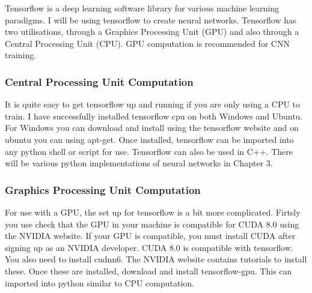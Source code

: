 Tensorflow is a deep learning software library for various machine learning paradigms. I will
be using tensorflow to create neural networks.
Tensorflow has two utilisations, through a Graphics Processing Unit (GPU) and
also through a Central Processing Unit (CPU).
GPU computation is recommended for CNN training. 

\subsubsection*{Central Processing Unit Computation}
It is quite easy to get tensorflow up and running if you are only using a CPU to
train. I have successfully installed tensorflow cpu on both Windows and Ubuntu.
For Windows you can download and install using the tensorflow website and on ubuntu you can
using apt-get. Once installed, tensorflow can be imported into any python shell
or script for use. Tensorflow can also be used in C++. There will be various
python implementations of neural networks in Chapter 3.

\subsubsection*{Graphics Processing Unit Computation}
For use with a GPU, the set up for tensorflow is a bit more complicated. Firtsly
you use check that the GPU in your machine is compatible for CUDA 8.0 using the
NVIDIA website. If your GPU is compatible, you must install CUDA after signing
up as an NVIDIA developer. CUDA 8.0 is compatible with tensorflow. You also need
to install cudnn6. The NVIDIA website contains tutorials to install these. Once
these are installed, download and install tensorflow-gpu. This can imported into
python similar to CPU computation.
